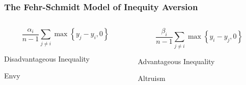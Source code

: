 \documentclass{beamer}
\begin{document}
\begin{frame}
	\frametitle{The Fehr-Schmidt Model of Inequity Aversion}
\begin{columns}
	\begin{column}{0.5\textwidth}
		\begin{equation*}
			\frac{\alpha_i}{n-1} \sum_{j\neq i} \max \left \{ y_j - y_i,0 \right \} 
		\end{equation*}
		\begin{center}
			Disadvantageous Inequality
		\end{center}
		\begin{center}
		Envy
		\end{center}
	\end{column}
	\begin{column}{0.5\textwidth}  %
		\begin{equation*}
\frac{\beta_i}{n-1} \sum_{j\neq i} \max \left \{ y_i - y_j,0 \right \}
\end{equation*}
\begin{center}
	Advantageous Inequality
\end{center}
\begin{center}
	Altruism
\end{center}
	\end{column}
\end{columns}
\end{frame}
\end{document}
